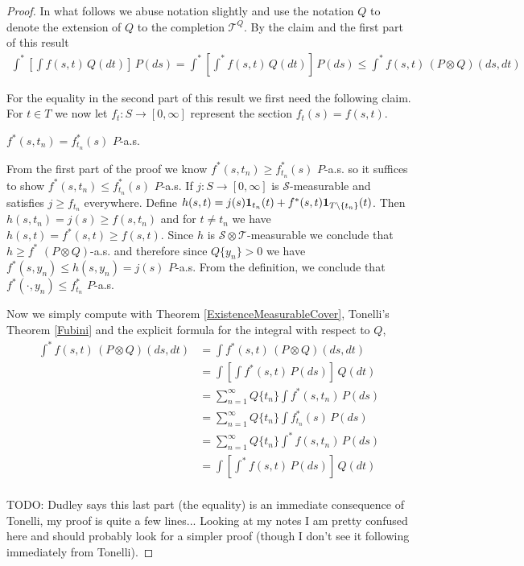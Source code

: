 \begin{proof}
In what follows we abuse notation slightly and use the notation $Q$ to denote the extension of $Q$ to the completion $\mathcal{T}^Q$.  By the claim and the first part of this result
\begin{align*}
\int^* \left [ \int f(s,t) \, Q(dt) \right ] \, P(ds) = \int^* \left [ \int^* f(s,t) \, Q(dt) \right ] \, P(ds) \leq \int^* f(s,t) \, (P \otimes Q)(ds,dt)
\end{align*}

For the equality in the second part of this result we first need the following claim.  For $t \in T$ we now let  $f_t : S \to [0,\infty]$ represent the section $f_t(s) = f(s,t)$.  
\begin{clm} $f^*(s,t_n) = f_{t_n}^*(s)$ $P$-a.s. 
\end{clm}
From the first part of the proof we know $f^*(s,t_n) \geq f_{t_n}^*(s)$ $P$-a.s. so it suffices to show $f^*(s,t_n) \leq f_{t_n}^*(s)$ $P$-a.s.  If $j : S \to [0,\infty]$ is $\mathcal{S}$-measurable and satisfies $j \geq f_{t_n}$ everywhere.  Define $h(s,t) = j(s) \textbf{1}_{t_n}(t) + f^*(s,t) \textbf{1}_{T \setminus \lbrace t_n \rbrace }(t)$.  Then
$h(s,t_n) = j(s) \geq f(s,t_n)$ and for $t \neq t_n$ we have $h(s,t) = f^*(s,t) \geq f(s,t)$.  Since $h$ is $\mathcal{S} \otimes \mathcal{T}$-measurable we conclude that $h \geq f^*$ $(P \otimes Q)$-a.s.  and therefore since $Q\lbrace y_n \rbrace > 0$  we have $f^*(s, y_n) \leq h(s, y_n) = j(s)$ $P$-a.s. From the definition, we conclude that $f^*(\cdot, y_n) \leq f_{t_n}^*$ $P$-a.s.

Now we simply compute with  Theorem \ref{ExistenceMeasurableCover}, Tonelli's Theorem \ref{Fubini} and the explicit formula for the integral with respect to $Q$,
\begin{align*}
\int^* f(s,t) \,  (P \otimes Q)(ds,dt) &= \int f^*(s,t) \, (P \otimes Q)(ds,dt)  \\
&= \int \left [ \int f^*(s,t) \, P(ds) \right ] \,   Q(dt)\\
&= \sum_{n=1}^\infty Q \lbrace t_n \rbrace \int f^*(s,t_n) \, P(ds) \\
&= \sum_{n=1}^\infty Q \lbrace t_n \rbrace \int f_{t_n}^*(s) \, P(ds) \\
&= \sum_{n=1}^\infty Q \lbrace t_n \rbrace \int^* f(s, t_n) \, P(ds) \\
&= \int \left [ \int^* f(s, t) \, P(ds) \right ] \,   Q(dt)\\
\end{align*}

TODO: Dudley says this last part (the equality) is an immediate consequence of Tonelli, my proof is quite a few lines...  Looking at my notes I am pretty confused here and should probably look for a simpler proof (though I don't see it following immediately from Tonelli). 


\end{proof}

